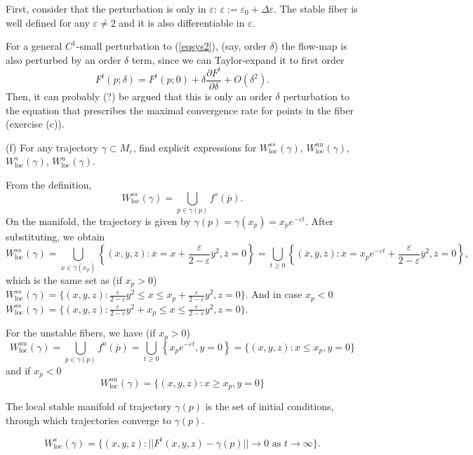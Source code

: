 \documentclass[a4paper,11pt,pdftex]{article}
\begin{document}
\begin{itemize}
First, consider that the perturbation is only in $\varepsilon$: $\varepsilon:= \varepsilon_0 + \Delta \varepsilon$. The stable fiber is well defined for any $\varepsilon \neq 2$ and it is also differentiable in $\varepsilon$. 


For a general $C^1$-small perturbation to (\ref{eqsys2}), (say, order $\delta$) the flow-map is also perturbed by an order $\delta$ term, since we can Taylor-expand it to first order
$$
F^t(p;\delta) = F^t(p;0) + \delta \frac{\partial F^t}{\partial \delta} + O(\delta^2).
$$
Then, it can probably (?) be argued that this is only an order $\delta$ perturbation to the equation that prescribes the maximal convergence rate for points in the fiber (exercise (c)).
\end{itemize}
(f) For any trajectory $\gamma \subset M_\varepsilon$, find explicit expressions for $W^{ss}_\text{loc}(\gamma)$, $W^{uu}_\text{loc}(\gamma)$, $W^{s}_\text{loc}(\gamma)$, $W^{u}_\text{loc}(\gamma)$.

From the definition, 
$$
W^{ss}_\text{loc}(\gamma) = \bigcup_{\overline{p}\in \gamma(p)} f^s(\overline{p}).
$$
On the manifold, the trajectory is given by $\gamma(p)=\gamma(x_p) = x_p e^{-\varepsilon t}$. After substituting, we obtain
$$
W^{ss}_\text{loc}(\gamma) = \bigcup_{x\in \gamma(x_p)}\left\{(\overline{x}, \overline{y}, \overline{z}) : \overline{x} = x + \frac{\varepsilon}{2-\varepsilon}\overline{y}^2 , \overline{z} = 0\right\}
 =\bigcup_{t\geq 0} \left\{(\overline{x}, \overline{y}, \overline{z}) : \overline{x}= x_pe^{-\varepsilon t} + \frac{\varepsilon}{2-\varepsilon}\overline{y}^2, \overline{z}=0 \right\},
 $$
 which is the same set as (if $x_p>0$) $W^{ss}_\text{loc}(\gamma) = \{(x,y,z): \frac{\varepsilon}{2-\varepsilon}y^2 \leq x \leq x_p +\frac{\varepsilon}{2-\varepsilon}y^2 , z=0\}$. And in case $x_p<0$ $W^{ss}_\text{loc}(\gamma) = \{(x,y,z): \frac{\varepsilon}{2-\varepsilon}y^2 +x_p \leq x \leq \frac{\varepsilon}{2-\varepsilon}y^2 , z=0\}$.
 
For the unstable fibers, we have (if $x_p>0$)
$$
W^{uu}_\text{loc}(\gamma) = \bigcup_{\overline{p}\in \gamma(p)} f^u(\overline{p}) = \bigcup_{t\geq 0} \left\{ x_pe^{-\varepsilon t}, y= 0 \right\} = \{(x,y,z): x \leq x_p, y=0\}
$$
and if $x_p<0$
$$
W^{uu}_\text{loc}(\gamma) = \{(x,y,z): x \geq x_p, y=0\}
$$


The local stable manifold of trajectory $\gamma(p)$ is the set of initial conditions, through which trajectories converge to $\gamma(p)$.

$$
W^s_\text{loc}(\gamma) = \{ (x,y,z): ||F^t(x,y,z) - \gamma(p)|| \to 0 \text{ as } t\to \infty\}. 
$$
\end{document}
